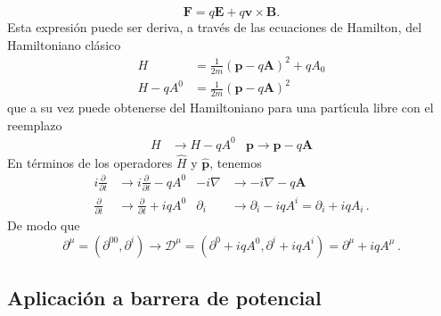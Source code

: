 \begin{equation}
  \mathbf{F}=q\mathbf{E}+q\mathbf{v}\times\mathbf{B}.
\end{equation}
Esta expresi\'on puede ser deriva, a trav\'es de las ecuaciones de Hamilton, del Hamiltoniano cl\'asico
\begin{align}
  \label{eq:158}
  H&=\frac{1}{2m}(\mathbf{p}-q\mathbf{A})^2+qA_0\\
  H-qA^0&=\frac{1}{2m}(\mathbf{p}-q\mathbf{A})^2\nonumber
\end{align}
que a su vez puede obtenerse del Hamiltoniano para una part\'\i cula libre con el reemplazo
\begin{align}
  H&\to H-qA^0& \mathbf{p}\to\mathbf{p}-q\mathbf{A}
\end{align}
En t\'erminos de los operadores $\hat H$ y $\hat{\mathbf{p}}$, tenemos
\begin{align}
  i\frac{\partial}{\partial t}&\to i\frac{\partial}{\partial t}-qA^0&  -i\nabla&\to-i\nabla-q\mathbf{A}\nonumber\\ 
  \frac{\partial}{\partial t}&\to\frac{\partial}{\partial t}+iqA^0&  \partial_i&\to\partial_i-iqA^i=\partial_i+iqA_i\,.
\end{align}
De modo que
\begin{equation}
  \partial^\mu=(\partial^00,\partial^i)\to\mathcal{D}^\mu=(\partial^0+iqA^0,\partial^i+iqA^i)=\partial^\mu+iqA^\mu\,.
\end{equation}


\subsection{Aplicaci\'on a barrera de potencial}

